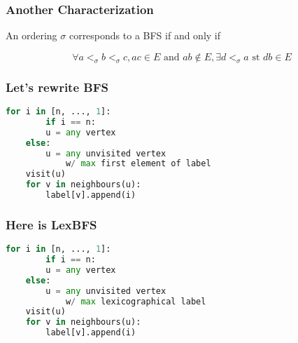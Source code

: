 \documentclass{beamer}
\begin{document}
\begin{frame}\frametitle{Another Characterization}
    \begin{theorem}
        An ordering $\sigma$ corresponds to a BFS if and only if
	    
	    $$\forall a <_{\sigma} b <_{\sigma} c, ac \in E\text{ and }ab \notin E, \exists d <_{\sigma} a\text{ st }db \in E$$
    \end{theorem}

    \begin{center}
    \end{center}

\end{frame}

\begin{frame}[fragile]\frametitle{Let's rewrite BFS}
    \begin{lstlisting}[language = Python]
    for i in [n, ..., 1]:
        if i == n:
	    u = any vertex
	else:
	    u = any unvisited vertex
	        w/ max first element of label
	visit(u)
	for v in neighbours(u):
	    label[v].append(i)
    \end{lstlisting}
\end{frame}

\begin{frame}[fragile]\frametitle{Here is LexBFS}
    \begin{lstlisting}[language = Python]
    for i in [n, ..., 1]:
        if i == n:
	    u = any vertex
	else:
	    u = any unvisited vertex
	        w/ max lexicographical label
	visit(u)
	for v in neighbours(u):
	    label[v].append(i)
    \end{lstlisting}
\end{frame}
\end{document}
